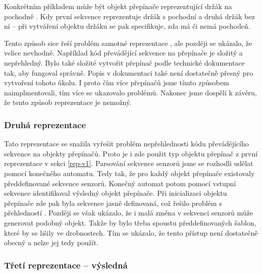 

Konkrétním příkladem může být objekt přepínače reprezentující držák na pochodně .
Kdy první sekvence reprezentuje držák s pochodní a druhá držák bez ní -- při vytváření objektu držáku se pak specifikuje, zda má či nemá pochodeň. 


Tento způsob sice řeší problém samotné reprezentace , ale později se ukázalo, že velice nevhodně. Například
kód převádějící sekvence na přepínače je složitý a nepřehledný. Bylo také složité vytvořit přepínač podle technické dokumentace \cite{TechnicalDocumentationFontanel05}
tak, aby fungoval správně. Popis v dokumentaci \cite{TechnicalDocumentationFontanel05} také není dostatečně přesný pro vytvoření tohoto úkolu.
I proto čím více přepínačů jsme tímto způsobem naimplmentovali, tím více se ukazovalo problémů. Nakonec jsme dospěli k závěru, že tento způsob reprezentace je nemožný.

\subsubsection{Druhá reprezentace}

Tato reprezentace se snažila vyřešit problém nepřehlednosti kódu převádějícího sekvence na objekty přepínačů.
Proto je i zde použit typ objektu přepínač z první reprezentace v sekci \ref{rep-v1}. Parsování sekvence senzorů jsme se rozhodli udělat pomocí konečného 
automatu. Tedy tak, že pro každý objekt přepínače existovaly předdefinované sekvence senzorů. Konečný automat potom pomocí vstupní sekvence
identifikoval výsledný objekt přepínače. Při inicializaci objektu přepínače zde pak byla sekvence jasně definovaná, což řešilo problém s přehledností .
Později se však ukázalo, že i malá změna v sekvenci senzorů může generovat podobný objekt. Takže by bylo třeba
spoustu předdefinovaných šablon, které by se lišily ve drobnostech. Tím se ukázalo, že tento přístup není dostatečně obecný a nelze jej tedy použít. 

\subsubsection{Třetí reprezentace -- výsledná}

